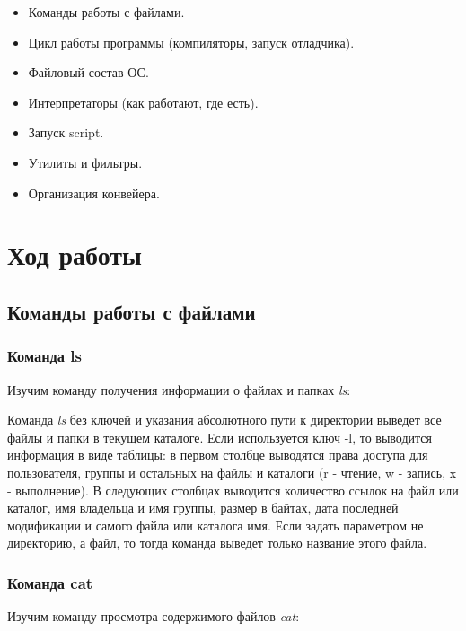 \documentclass[14pt,a4paper,report]{report}
\begin{document}
\begin{itemize}
	\item Команды работы с файлами.
	\item Цикл работы программы (компиляторы, запуск отладчика).
	\item Файловый состав ОС.
	\item Интерпретаторы (как работают, где есть).
	\item Запуск script.
	\item Утилиты и фильтры.
	\item Организация конвейера.
\end{itemize}

\clearpage

\section{Ход работы}

\subsection{Команды работы с файлами}

\subsubsection{Команда ls}

Изучим команду получения информации о файлах и папках \emph{ls}:



Команда \emph{ls} без ключей и указания абсолютного пути к директории выведет все файлы и папки в текущем каталоге. Если используется ключ -l, то выводится информация в виде таблицы: в первом столбце выводятся права доступа для пользователя, группы и остальных на файлы и каталоги (r - чтение, w - запись, x - выполнение). В следующих столбцах выводится количество ссылок на файл или каталог, имя владельца и имя группы, размер в байтах, дата последней модификации и самого файла или каталога имя. Если задать параметром не директорию, а файл, то тогда команда выведет только название этого файла.

\subsubsection{Команда cat}

Изучим команду просмотра содержимого файлов \emph{cat}:


\end{document}
